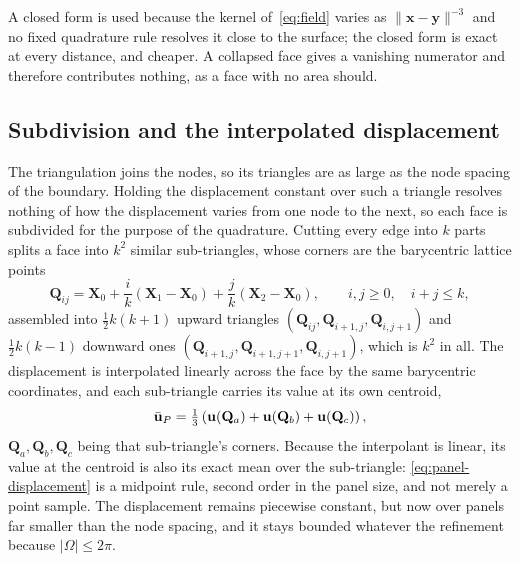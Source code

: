 A closed form is used because the kernel of~\eqref{eq:field} varies as
$\lVert \mathbf{x}-\mathbf{y}\rVert^{-3}$ and no fixed quadrature rule resolves
it close to the surface; the closed form is exact at every distance, and
cheaper. A collapsed face gives a vanishing numerator and therefore contributes
nothing, as a face with no area should.

\subsection*{Subdivision and the interpolated displacement}

The triangulation joins the nodes, so its triangles are as large as the node
spacing of the boundary. Holding the displacement constant over such a triangle
resolves nothing of how the displacement varies from one node to the next, so
each face is subdivided for the purpose of the quadrature. Cutting every edge
into $k$ parts splits a face into $k^{2}$ similar sub-triangles, whose corners
are the barycentric lattice points
\begin{equation}
  \mathbf{Q}_{ij}
  = \mathbf{X}_0
    + \frac{i}{k}\left( \mathbf{X}_1 - \mathbf{X}_0 \right)
    + \frac{j}{k}\left( \mathbf{X}_2 - \mathbf{X}_0 \right),
  \qquad i,j \ge 0, \quad i+j \le k ,
  \label{eq:subdivision}
\end{equation}
assembled into $\tfrac{1}{2}k(k+1)$ upward triangles
$(\mathbf{Q}_{ij},\mathbf{Q}_{i+1,j},\mathbf{Q}_{i,j+1})$ and
$\tfrac{1}{2}k(k-1)$ downward ones
$(\mathbf{Q}_{i+1,j},\mathbf{Q}_{i+1,j+1},\mathbf{Q}_{i,j+1})$, which is $k^{2}$
in all. The displacement is interpolated linearly across the face by the same
barycentric coordinates, and each sub-triangle carries its value at its own
centroid,
\begin{equation}
  \bar{\mathbf{u}}_{P}
  = \tfrac{1}{3}\left( \mathbf{u}(\mathbf{Q}_{a}) + \mathbf{u}(\mathbf{Q}_{b})
                     + \mathbf{u}(\mathbf{Q}_{c}) \right),
  \label{eq:panel-displacement}
\end{equation}
$\mathbf{Q}_a,\mathbf{Q}_b,\mathbf{Q}_c$ being that sub-triangle's corners.
Because the interpolant is linear, its value at the centroid is also its exact
mean over the sub-triangle: \eqref{eq:panel-displacement} is a midpoint rule,
second order in the panel size, and not merely a point sample. The
displacement remains piecewise constant, but now over panels far smaller than
the node spacing, and it stays bounded whatever the refinement because
$\lvert\Omega\rvert \le 2\pi$.

